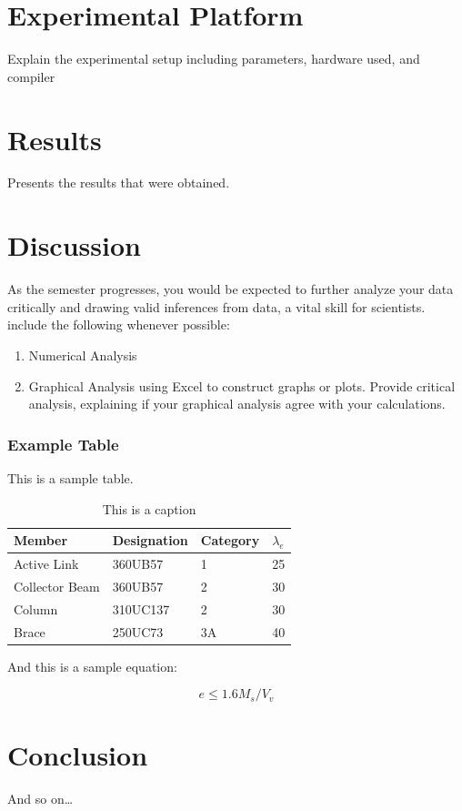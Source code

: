 \documentclass[10pt,a4paper]{article} %
\begin{document}
\section{Experimental Platform}
Explain the experimental setup including parameters, hardware used, and compiler

\section{Results}
Presents the results that were obtained.

\section{Discussion}

As the semester progresses, you would be expected to further analyze your data critically and drawing valid inferences from data, a vital skill for scientists.  include the following whenever possible:
\begin{enumerate}

	\item Numerical Analysis
	\item Graphical Analysis using Excel to construct graphs or plots.  Provide critical analysis, explaining if your graphical analysis agree with your calculations.
\end{enumerate}


\subsubsection{Example Table}
This is a sample table.

\begin{table}[h]
\begin{center}
\begin{tabular}{|l||l|l|l|}
\hline
Member & Designation & Category & $\lambda_e$\\
\hline
Active Link & 360UB57 & 1 & 25 \\
Collector Beam & 360UB57 & 2 & 30 \\
Column & 310UC137 & 2 & 30 \\
Brace & 250UC73 & 3A & 40 \\
\hline
\end{tabular}
\end{center}
\caption{This is a caption}
\end{table}

And this is a sample equation:

\begin{equation*}
\tag{Eq. 1}
e \leqslant 1.6M_s/V_v
\end{equation*}



\section{Conclusion}
And so on\dots

\end{document}
